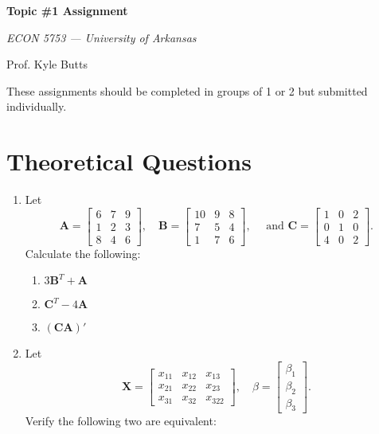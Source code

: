 \documentclass[12pt]{article}
\begin{document}
\begin{center}
  {\Huge\bf Topic \#1 Assignment}
  
  \smallskip
  {\large\it  ECON 5753 — University of Arkansas}

  \medskip
  {\large Prof. Kyle Butts}
\end{center}

These assignments should be completed in groups of 1 or 2 but submitted individually. 

\section*{Theoretical Questions}

\begin{enumerate}
  \item Let 
  $$
    \bm{A} = \begin{bmatrix} 6 & 7 & 9 \\ 1 & 2 & 3 \\ 8 & 4 & 6 \end{bmatrix}, 
    \quad 
    \bm{B} = \begin{bmatrix} 10 & 9 & 8 \\ 7 & 5 & 4 \\ 1 & 7 & 6 \end{bmatrix},
    \quad \text{ and } 
    \bm{C} = \begin{bmatrix} 1 & 0 & 2 \\ 0 & 1 & 0 \\ 4 & 0 & 2 \end{bmatrix}.
  $$ 
  Calculate the following:
  
  \begin{enumerate}
    \item $3\bm{B}^T + \bm{A}$
    \item $\bm{C}^T - 4\bm{A}$
    \item $(\bm{C}\bm{A})'$
  \end{enumerate}
  
  \bigskip\bigskip
  \item Let 
  $$
    \bm{X} = \begin{bmatrix} x_{11} & x_{12} & x_{13} \\ x_{21} & x_{22} & x_{23} \\ x_{31} & x_{32} & x_322 \end{bmatrix}, 
    \quad 
    \beta = \begin{bmatrix} \beta_1 \\ \beta_2 \\ \beta_3 \end{bmatrix}.
  $$ 
  Verify the following two are equivalent:


\end{enumerate}
\end{document}
